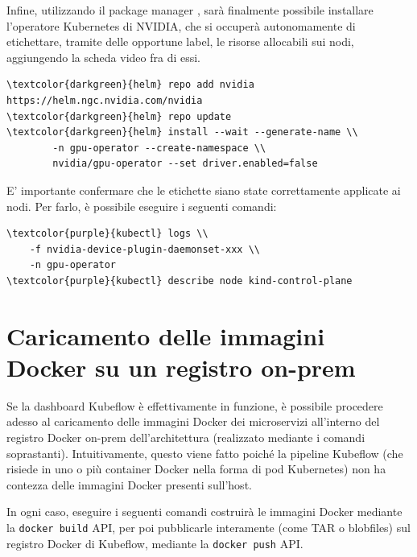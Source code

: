 Infine, utilizzando il package manager , sarà finalmente possibile installare l'operatore Kubernetes di NVIDIA, che si occuperà autonomamente di etichettare, tramite delle opportune label, le risorse allocabili sui nodi, aggiungendo la scheda video fra di essi.

\begin{small}
\begin{Verbatim}[commandchars=\\\{\}]
\textcolor{darkgreen}{helm} repo add nvidia https://helm.ngc.nvidia.com/nvidia
\textcolor{darkgreen}{helm} repo update
\textcolor{darkgreen}{helm} install --wait --generate-name \\
        -n gpu-operator --create-namespace \\
        nvidia/gpu-operator --set driver.enabled=false
\end{Verbatim}
\end{small}

E' importante confermare che le etichette siano state correttamente applicate ai nodi. Per farlo, è possibile eseguire i seguenti comandi:

\begin{small}
\begin{Verbatim}[commandchars=\\\{\}]
\textcolor{purple}{kubectl} logs \\
    -f nvidia-device-plugin-daemonset-xxx \\
    -n gpu-operator
\textcolor{purple}{kubectl} describe node kind-control-plane
\end{Verbatim}
\end{small}

\section{Caricamento delle immagini Docker su un registro on-prem}

Se la dashboard Kubeflow è effettivamente in funzione, è possibile procedere adesso al caricamento delle immagini Docker dei microservizi all'interno del registro Docker on-prem dell'architettura (realizzato mediante i comandi soprastanti). Intuitivamente, questo viene fatto poiché la pipeline Kubeflow (che risiede in uno o più container Docker nella forma di pod Kubernetes) non ha contezza delle immagini Docker presenti sull'host.

In ogni caso, eseguire i seguenti comandi costruirà le immagini Docker mediante la {\small \verb|docker build|} API, per poi pubblicarle interamente (come TAR o blobfiles) sul registro Docker di Kubeflow, mediante la {\small \verb|docker push|} API.


